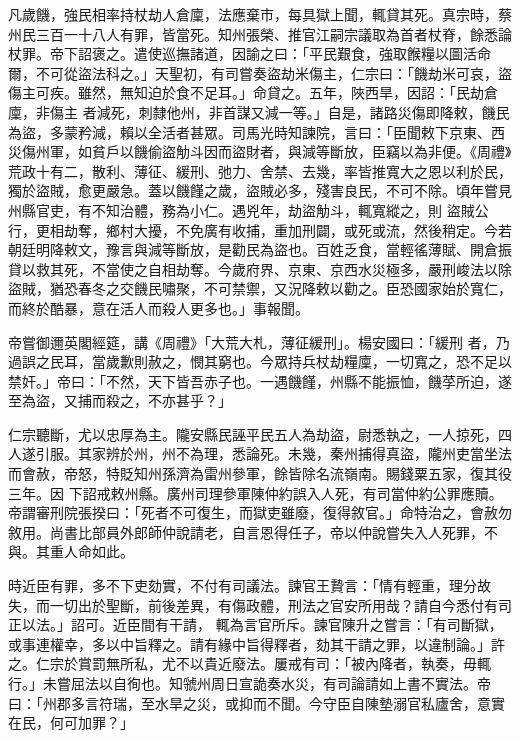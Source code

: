 \begin{pinyinscope}
 凡歲饑，強民相率持杖劫人倉廩，法應棄市，每具獄上聞，輒貸其死。真宗時，蔡州民三百一十八人有罪，皆當死。知州張榮、推官江嗣宗議取為首者杖脊，餘悉論杖罪。帝下詔褒之。遣使巡撫諸道，因諭之曰：「平民艱食，強取餱糧以圖活命爾，不可從盜法科之。」天聖初，有司嘗奏盜劫米傷主，仁宗曰：「饑劫米可哀，盜傷主可疾。雖然，無知迫於食不足耳。」命貸之。五年，陜西旱，因詔：「民劫倉廩，非傷主
 者減死，刺隸他州，非首謀又減一等。」自是，諸路災傷即降敕，饑民為盜，多蒙矜減，賴以全活者甚眾。司馬光時知諫院，言曰：「臣聞敕下京東、西災傷州軍，如貧戶以饑偷盜觔斗因而盜財者，與減等斷放，臣竊以為非便。《周禮》荒政十有二，散利、薄征、緩刑、弛力、舍禁、去幾，率皆推寬大之恩以利於民，獨於盜賊，愈更嚴急。蓋以饑饉之歲，盜賊必多，殘害良民，不可不除。頃年嘗見州縣官吏，有不知治體，務為小仁。遇兇年，劫盜觔斗，輒寬縱之，則
 盜賊公行，更相劫奪，鄉村大擾，不免廣有收捕，重加刑闢，或死或流，然後稍定。今若朝廷明降敕文，豫言與減等斷放，是勸民為盜也。百姓乏食，當輕徭薄賦、開倉振貸以救其死，不當使之自相劫奪。今歲府界、京東、京西水災極多，嚴刑峻法以除盜賊，猶恐春冬之交饑民嘯聚，不可禁禦，又況降敕以勸之。臣恐國家始於寬仁，而終於酷暴，意在活人而殺人更多也。」事報聞。



 帝嘗御邇英閣經筵，講《周禮》「大荒大札，薄征緩刑」。楊安國曰：「緩刑
 者，乃過誤之民耳，當歲歉則赦之，憫其窮也。今眾持兵杖劫糧廩，一切寬之，恐不足以禁奸。」帝曰：「不然，天下皆吾赤子也。一遇饑饉，州縣不能振恤，饑莩所迫，遂至為盜，又捕而殺之，不亦甚乎？」



 仁宗聽斷，尤以忠厚為主。隴安縣民誣平民五人為劫盜，尉悉執之，一人掠死，四人遂引服。其家辨於州，州不為理，悉論死。未幾，秦州捕得真盜，隴州吏當坐法而會赦，帝怒，特貶知州孫濟為雷州參軍，餘皆除名流嶺南。賜錢粟五家，復其役三年。因
 下詔戒敕州縣。廣州司理參軍陳仲約誤入人死，有司當仲約公罪應贖。帝謂審刑院張揆曰：「死者不可復生，而獄吏雖廢，復得敘官。」命特治之，會赦勿敘用。尚書比部員外郎師仲說請老，自言恩得任子，帝以仲說嘗失入人死罪，不與。其重人命如此。



 時近臣有罪，多不下吏劾實，不付有司議法。諫官王贄言：「情有輕重，理分故失，而一切出於聖斷，前後差異，有傷政體，刑法之官安所用哉？請自今悉付有司正以法。」詔可。近臣間有干請，
 輒為言官所斥。諫官陳升之嘗言：「有司斷獄，或事連權幸，多以中旨釋之。請有緣中旨得釋者，劾其干請之罪，以違制論。」許之。仁宗於賞罰無所私，尤不以貴近廢法。屢戒有司：「被內降者，執奏，毋輒行。」未嘗屈法以自徇也。知虢州周日宣詭奏水災，有司論請如上書不實法。帝曰：「州郡多言符瑞，至水旱之災，或抑而不聞。今守臣自陳墊溺官私廬舍，意實在民，何可加罪？」




\end{pinyinscope}
